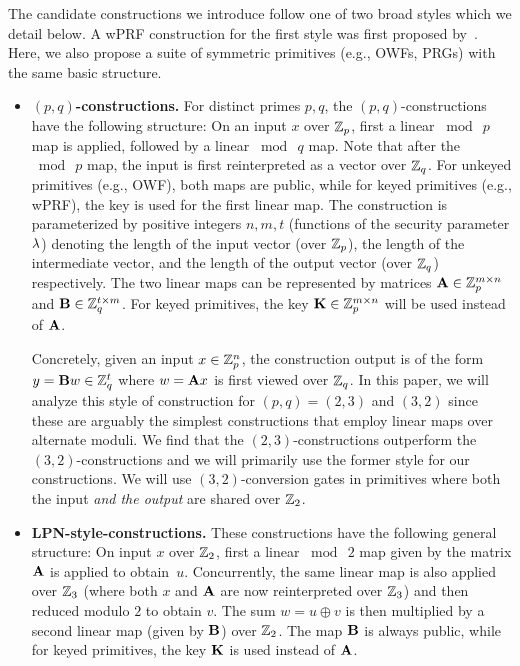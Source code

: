 The candidate constructions we introduce follow one of two broad styles which we detail below. A wPRF construction for the first style was first proposed by~\cite{boneh2018-darkmatter}. Here, we also propose a suite of symmetric primitives (e.g., OWFs, PRGs) with the same basic structure.


\begin{itemize}
    \item \textbf{$(p,q)$-constructions.}
    For distinct primes $p, q$, the $(p,q)$-constructions have the following structure: On an input $x$ over $\mathbb{Z}_p$, first a linear $\bmod~p$ map is applied, followed by a linear $\bmod~q$ map. Note that after the $\bmod~p$ map, the input is first reinterpreted as a vector over $\mathbb{Z}_q$. For unkeyed primitives (e.g., OWF), both maps are public, while for keyed primitives (e.g., wPRF), the key is used for the first linear map. The construction is parameterized by positive integers $n, m, t$ (functions of the security parameter $\lambda$) denoting the length of the input vector (over $\mathbb{Z}_p$), the length of the intermediate vector, and the length of the output vector (over $\mathbb{Z}_q$) respectively. The two linear maps can be represented by matrices $\mat{A} \in \Z_p^{m \times n}$ and $\mat{B} \in \Z_q^{t \times m}$. For keyed primitives, the key $\mat{K} \in \Z_p^{m \times n}$ will be used instead of $\mat{A}$.

    \hspace*{1em} Concretely, given an input $x \in \mathbb{Z}_p^n$, the construction output is of the form $y = \mat{B}w \in \Z_q^t$ where $w = \mat{A}{x}$ is first viewed over $\mathbb{Z}_q$. In this paper, we will analyze this style of construction for $(p,q) = (2,3)$ and $(3,2)$ since these are arguably the simplest constructions that employ linear maps over alternate moduli. We find that the $(2,3)$-constructions outperform the $(3,2)$-constructions and we will primarily use the former style for our constructions. We will use $(3,2)$-conversion gates in primitives where both the input {\em and the output} are shared over $\mathbb{Z}_2$.  
    
    \item \textbf{LPN-style-constructions.}
    These constructions have the following general structure: On input $x$ over $\mathbb{Z}_2$, first a linear $\bmod~2$ map given by the matrix $\mat{A}$ is applied to obtain~$u$. Concurrently, the same linear map is also applied over $\mathbb{Z}_3$ (where both $x$ and $\mat{A}$ are now reinterpreted over $\mathbb{Z}_3$) and then reduced modulo $2$ to obtain $v$. The sum $w = u \oplus v$ is then multiplied by a second linear map (given by $\mat{B}$) over $\mathbb{Z}_2$. The map $\mat{B}$ is always public, while for keyed primitives, the key $\mat{K}$ is used instead of $\mat{A}$.


\end{itemize}
